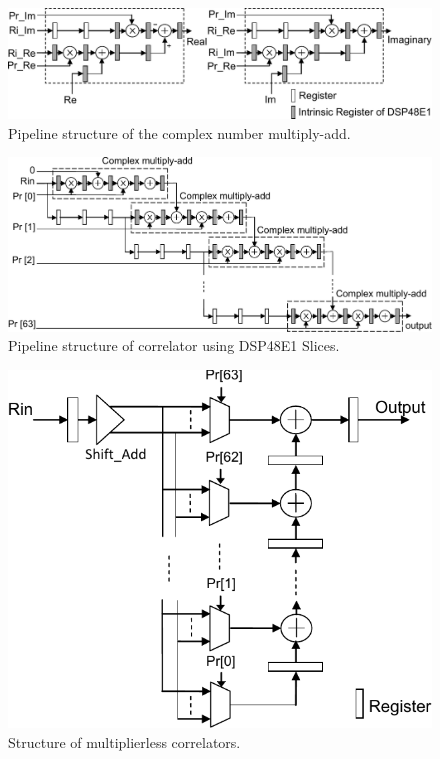 \begin{figure}
	\centerline{\includegraphics [width=0.9\columnwidth] {figures/Cmp_MultAdder.pdf} }
	\caption{Pipeline structure of the complex number multiply-add.}
	\label{fig:Cmp_MultAdder}
\end{figure}

\begin{figure}
	\centerline{\includegraphics [width=0.9\columnwidth] {figures/DSP48pp_correlator.pdf} }
	\caption{Pipeline structure of correlator using DSP48E1 Slices.}
	\label{fig:DSP48pp_correlator}
\end{figure}

\begin{figure}
	\centerline{\includegraphics [width=0.7\columnwidth] {figures/ML_correlator.pdf} }
	\caption{Structure of multiplierless correlators.}
	\label{fig:ML_correlator}
\end{figure}

